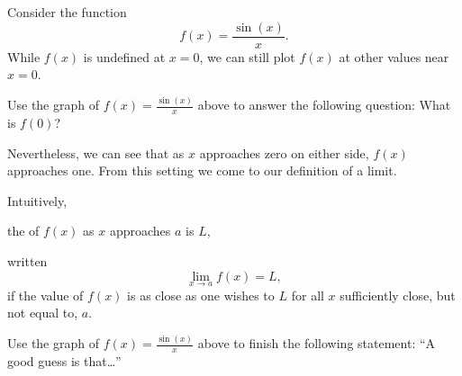 \documentclass{ximera}
\begin{document}
Consider the function
\[
f(x) = \frac{\sin(x)}{x}.
\]
While $f(x)$ is undefined at $x=0$, we can still plot $f(x)$ at other
values near $x = 0$.
\begin{image}
\end{image}

\begin{question}
  Use the graph of $f(x) = \frac{\sin(x)}{x}$ above to answer the
  following question: What is $f(0)$?
  \begin{multipleChoice}
  \end{multipleChoice}
\end{question}

Nevertheless, we can see that as $x$ approaches zero on either side, $f(x)$
approaches one. From this setting we come to our definition of a
limit.

\begin{definition}
  Intuitively,
  \begin{center}
    the  of $f(x)$ as $x$ approaches $a$ is $L$,
  \end{center}
  written
  \[
  \lim_{x\to a} f(x) = L,
  \]
  if the value of $f(x)$ is as close as one wishes to $L$ for
  all $x$ sufficiently close, but not equal to, $a$.
\end{definition}

\begin{question}
  Use the graph of $f(x) = \frac{\sin(x)}{x}$ above to finish the following statement: ``A good guess is that\dots''
  \begin{multipleChoice}
  \end{multipleChoice}
\end{question}
\end{document}
